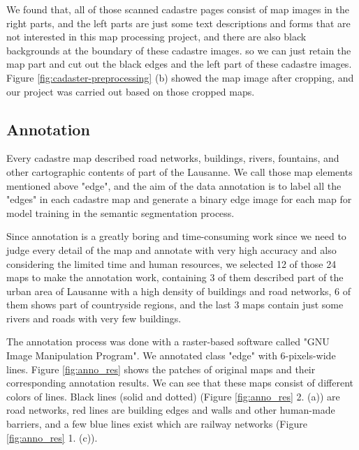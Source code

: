 \documentclass[12pt]{article}
\begin{document}
We found that, all of those scanned cadastre pages consist of map images in the right parts, and the left parts are just some text descriptions and forms that are not interested in this map processing project, and there are also black backgrounds at the boundary of these cadastre images. so we can just retain the map part and cut out the black edges and the left part of these cadastre images. Figure \ref{fig:cadaster-preprocessing} (b) showed the map image after cropping, and our project was carried out based on those cropped maps. 
\subsection{Annotation}

Every cadastre map described road networks, buildings, rivers, fountains, and other cartographic contents of part of the Lausanne. We call those map elements mentioned above "edge", and the aim of the data annotation is to label all the "edges" in each cadastre map and generate a binary edge image for each map for model training in the semantic segmentation process.
 
Since annotation is a greatly boring and time-consuming work since we need to judge every detail of the map and annotate with very high accuracy and also considering the limited time and human resources, we selected 12 of those 24 maps to make the annotation work, containing 3 of them described part of the urban area of Lausanne with a high density of buildings and road networks, 6 of them shows part of countryside regions, and the last 3 maps contain just some rivers and roads with very few buildings.

The annotation process was done with a raster-based software called "GNU Image Manipulation Program". We annotated class "edge" with 6-pixels-wide lines. Figure \ref{fig:anno_res} shows the patches of original maps and their corresponding annotation results. We can see that these maps consist of different colors of lines. Black lines (solid and dotted) (Figure \ref{fig:anno_res} 2. (a)) are road networks, red lines are building edges and walls and other human-made barriers, and a few blue lines exist which are railway networks (Figure \ref{fig:anno_res} 1. (c)). 
\end{document}
